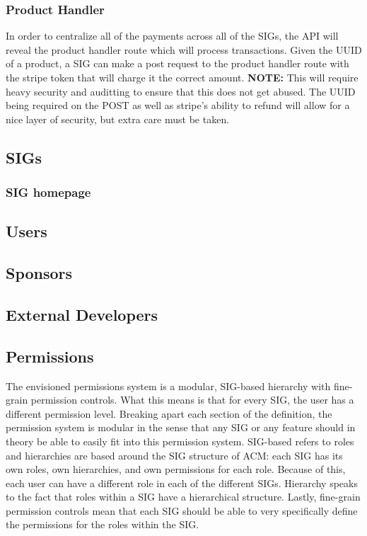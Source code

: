 \documentclass{article}
\begin{document}
\subsubsection{Product Handler}
In order to centralize all of the payments across all of the SIGs, the API will
reveal the product handler route which will process transactions. Given the UUID
of a product, a SIG can make a post request to the product handler route with the
stripe token that will charge it the correct amount. \textbf{NOTE:} This will
require heavy security and auditting to ensure that this does not get abused.
The UUID being required on the POST as well as stripe's ability to refund will 
allow for a nice layer of security, but extra care must be taken.

\subsection{SIGs}
\subsubsection{SIG homepage}
\subsection{Users}
\subsection{Sponsors}
\subsection{External Developers}
\subsection{Permissions}
The envisioned permissions system is a modular, SIG-based hierarchy with 
fine-grain permission controls. What this means is that for every SIG, the
user has a different permission level. Breaking apart each section of the 
definition, the permission system is modular in the sense that any SIG
or any feature should in theory be able to easily fit into this permission
system. SIG-based refers to roles and hierarchies are based around the SIG 
structure of ACM: each SIG has its own roles, own hierarchies, and own permissions
for each role. Because of this, each user can have a different role in each of the
different SIGs. Hierarchy speaks to the fact that roles within a SIG have
a hierarchical structure. Lastly, fine-grain permission controls mean that
each SIG should be able to very specifically define the permissions for the
roles within the SIG.
\end{document}

